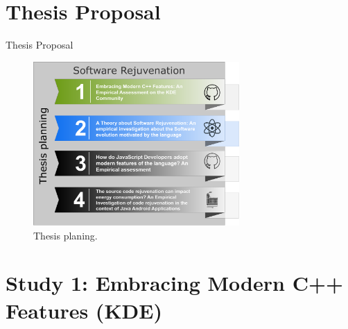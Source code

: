 \documentclass[newPxFont,numfooter,sectionpages]{beamer}
\begin{document}



\section{Thesis Proposal}


\begin{frame}{Thesis Proposal}
\centering
\begin{figure}
        \caption{Thesis planing.}
	\includegraphics[width=0.7\textwidth]{images/thesis-planing.pdf}
\end{figure}
\end{frame}


%
%
\section{Study 1: Embracing Modern C++ Features (KDE)}
\end{document}
